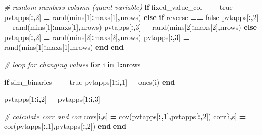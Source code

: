 \documentclass[
]{article}
\newenvironment{Shaded}{\begin{snugshade}}{\end{snugshade}}
\newcommand{\CommentTok}[1]{\textcolor[rgb]{0.56,0.35,0.01}{\textit{#1}}}
\newcommand{\ExtensionTok}[1]{#1}
\newcommand{\FloatTok}[1]{\textcolor[rgb]{0.00,0.00,0.81}{#1}}
\newcommand{\KeywordTok}[1]{\textcolor[rgb]{0.13,0.29,0.53}{\textbf{#1}}}
\newcommand{\NormalTok}[1]{#1}
\newcommand{\OperatorTok}[1]{\textcolor[rgb]{0.81,0.36,0.00}{\textbf{#1}}}
\begin{document}
\begin{Shaded}
\begin{Highlighting}[]
        \CommentTok{\# random numbers column (quant variable)}
        \KeywordTok{if}\NormalTok{ fixed\_value\_col }\OperatorTok{==} \ExtensionTok{true}
\NormalTok{            pvtapps[}\OperatorTok{:,}\FloatTok{2}\NormalTok{] }\OperatorTok{=}\NormalTok{ rand(mins[}\FloatTok{1}\NormalTok{]}\OperatorTok{:}\NormalTok{maxs[}\FloatTok{1}\NormalTok{]}\OperatorTok{,}\NormalTok{nrows)}
        \KeywordTok{else}
            \KeywordTok{if}\NormalTok{ reverse }\OperatorTok{==} \ExtensionTok{false}
\NormalTok{                pvtapps[}\OperatorTok{:,}\FloatTok{2}\NormalTok{] }\OperatorTok{=}\NormalTok{ rand(mins[}\FloatTok{1}\NormalTok{]}\OperatorTok{:}\NormalTok{maxs[}\FloatTok{1}\NormalTok{]}\OperatorTok{,}\NormalTok{nrows)}
\NormalTok{                pvtapps[}\OperatorTok{:,}\FloatTok{3}\NormalTok{] }\OperatorTok{=}\NormalTok{ rand(mins[}\FloatTok{2}\NormalTok{]}\OperatorTok{:}\NormalTok{maxs[}\FloatTok{2}\NormalTok{]}\OperatorTok{,}\NormalTok{nrows)}
            \KeywordTok{else} 
\NormalTok{                pvtapps[}\OperatorTok{:,}\FloatTok{2}\NormalTok{] }\OperatorTok{=}\NormalTok{ rand(mins[}\FloatTok{2}\NormalTok{]}\OperatorTok{:}\NormalTok{maxs[}\FloatTok{2}\NormalTok{]}\OperatorTok{,}\NormalTok{nrows)}
\NormalTok{                pvtapps[}\OperatorTok{:,}\FloatTok{3}\NormalTok{] }\OperatorTok{=}\NormalTok{ rand(mins[}\FloatTok{1}\NormalTok{]}\OperatorTok{:}\NormalTok{maxs[}\FloatTok{1}\NormalTok{]}\OperatorTok{,}\NormalTok{nrows)}
            \KeywordTok{end}
        \KeywordTok{end}

        \CommentTok{\# loop for changing values}
        \KeywordTok{for}\NormalTok{ i }\KeywordTok{in} \FloatTok{1}\OperatorTok{:}\NormalTok{nrows}

            \KeywordTok{if}\NormalTok{ sim\_binaries }\OperatorTok{==} \ExtensionTok{true}
\NormalTok{                pvtapps[}\FloatTok{1}\OperatorTok{:}\NormalTok{i}\OperatorTok{,}\FloatTok{1}\NormalTok{] }\OperatorTok{=}\NormalTok{ ones(i)}
            \KeywordTok{end}

\NormalTok{            pvtapps[}\FloatTok{1}\OperatorTok{:}\NormalTok{i}\OperatorTok{,}\FloatTok{2}\NormalTok{] }\OperatorTok{=}\NormalTok{ pvtapps[}\FloatTok{1}\OperatorTok{:}\NormalTok{i}\OperatorTok{,}\FloatTok{3}\NormalTok{]}

            \CommentTok{\# calculate corr and cov}
\NormalTok{            covs[i}\OperatorTok{,}\NormalTok{s] }\OperatorTok{=}\NormalTok{ cov(pvtapps[}\OperatorTok{:,}\FloatTok{1}\NormalTok{]}\OperatorTok{,}\NormalTok{pvtapps[}\OperatorTok{:,}\FloatTok{2}\NormalTok{])}
\NormalTok{            corr[i}\OperatorTok{,}\NormalTok{s] }\OperatorTok{=}\NormalTok{ cor(pvtapps[}\OperatorTok{:,}\FloatTok{1}\NormalTok{]}\OperatorTok{,}\NormalTok{pvtapps[}\OperatorTok{:,}\FloatTok{2}\NormalTok{])}
        \KeywordTok{end}
    \KeywordTok{end}


\end{Highlighting}
\end{Shaded}
\end{document}
